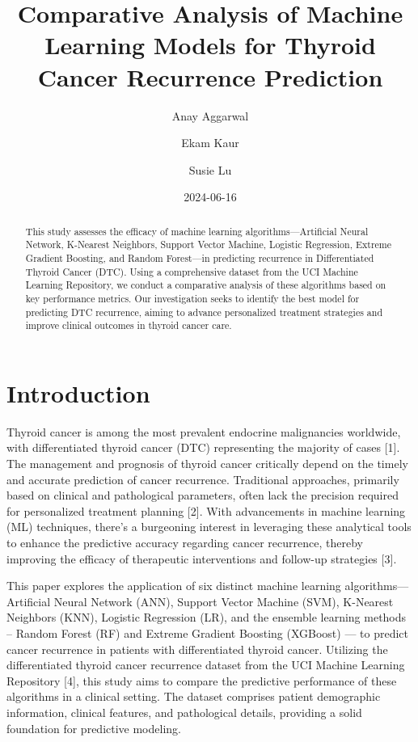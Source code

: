 \documentclass[
  letterpaper,
  DIV=11,
  numbers=noendperiod]{scrartcl}
\title{Comparative Analysis of Machine Learning Models for Thyroid
Cancer Recurrence Prediction}
\author{Anay Aggarwal \and Ekam Kaur \and Susie Lu}
\date{2024-06-16}
\begin{document}
\maketitle
\begin{abstract}
This study assesses the efficacy of machine learning
algorithms---Artificial Neural Network, K-Nearest Neighbors, Support
Vector Machine, Logistic Regression, Extreme Gradient Boosting, and
Random Forest---in predicting recurrence in Differentiated Thyroid
Cancer (DTC). Using a comprehensive dataset from the UCI Machine
Learning Repository, we conduct a comparative analysis of these
algorithms based on key performance metrics. Our investigation seeks to
identify the best model for predicting DTC recurrence, aiming to advance
personalized treatment strategies and improve clinical outcomes in
thyroid cancer care.
\end{abstract}

\section{Introduction}\label{introduction}

Thyroid cancer is among the most prevalent endocrine malignancies
worldwide, with differentiated thyroid cancer (DTC) representing the
majority of cases {[}1{]}. The management and prognosis of thyroid
cancer critically depend on the timely and accurate prediction of cancer
recurrence. Traditional approaches, primarily based on clinical and
pathological parameters, often lack the precision required for
personalized treatment planning {[}2{]}. With advancements in machine
learning (ML) techniques, there's a burgeoning interest in leveraging
these analytical tools to enhance the predictive accuracy regarding
cancer recurrence, thereby improving the efficacy of therapeutic
interventions and follow-up strategies {[}3{]}.

This paper explores the application of six distinct machine learning
algorithms---Artificial Neural Network (ANN), Support Vector Machine
(SVM), K-Nearest Neighbors (KNN), Logistic Regression (LR), and the
ensemble learning methods -- Random Forest (RF) and Extreme Gradient
Boosting (XGBoost) --- to predict cancer recurrence in patients with
differentiated thyroid cancer. Utilizing the differentiated thyroid
cancer recurrence dataset from the UCI Machine Learning Repository
{[}4{]}, this study aims to compare the predictive performance of these
algorithms in a clinical setting. The dataset comprises patient
demographic information, clinical features, and pathological details,
providing a solid foundation for predictive modeling.
\end{document}
